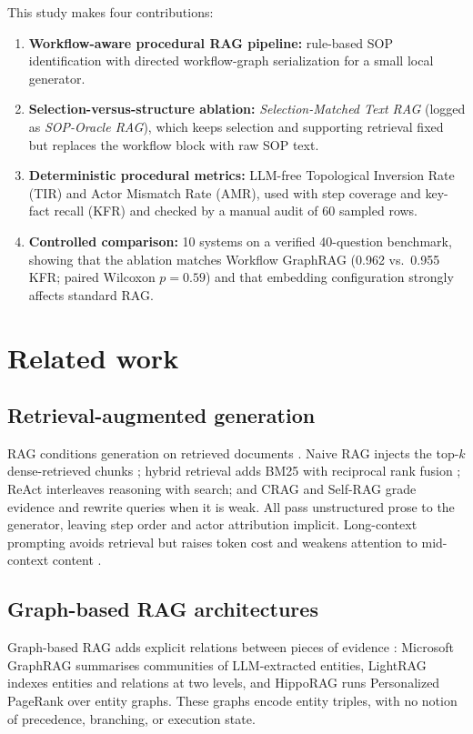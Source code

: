 \documentclass[a4paper,fleqn]{cas-sc}
\begin{document}
This study makes four contributions:
\begin{enumerate}[leftmargin=*]
\item \textbf{Workflow-aware procedural RAG pipeline:} rule-based SOP identification with directed workflow-graph serialization for a small local generator.
\item \textbf{Selection-versus-structure ablation:} \emph{Selection-Matched Text RAG} (logged as \emph{SOP-Oracle RAG}), which keeps selection and supporting retrieval fixed but replaces the workflow block with raw SOP text.
\item \textbf{Deterministic procedural metrics:} LLM-free Topological Inversion Rate (TIR) and Actor Mismatch Rate (AMR), used with step coverage and key-fact recall (KFR) and checked by a manual audit of 60 sampled rows.
\item \textbf{Controlled comparison:} 10 systems on a verified 40-question benchmark, showing that the ablation matches Workflow GraphRAG (0.962 vs.\ 0.955 KFR; paired Wilcoxon $p=0.59$) and that embedding configuration strongly affects standard RAG.
\end{enumerate}

\section{Related work}
\label{sec:related}

\subsection{Retrieval-augmented generation}
RAG conditions generation on retrieved documents \cite{lewis2020rag}. Naive RAG injects the top-$k$ dense-retrieved chunks \cite{gao2023ragsurvey}; hybrid retrieval adds BM25 \cite{robertson2009bm25} with reciprocal rank fusion \cite{cormack2009rrf}; ReAct \cite{yao2023react} interleaves reasoning with search; and CRAG \cite{yan2024crag} and Self-RAG \cite{asai2024selfrag} grade evidence and rewrite queries when it is weak. All pass unstructured prose to the generator, leaving step order and actor attribution implicit. Long-context prompting avoids retrieval but raises token cost and weakens attention to mid-context content \cite{liu2024lost}.

\subsection{Graph-based RAG architectures}
Graph-based RAG adds explicit relations between pieces of evidence \cite{peng2024graphragsurvey,pan2024unifying}: Microsoft GraphRAG \cite{edge2024graphrag} summarises communities of LLM-extracted entities, LightRAG \cite{guo2024lightrag} indexes entities and relations at two levels, and HippoRAG \cite{gutierrez2024hipporag} runs Personalized PageRank over entity graphs. These graphs encode entity triples, with no notion of precedence, branching, or execution state.
\end{document}

